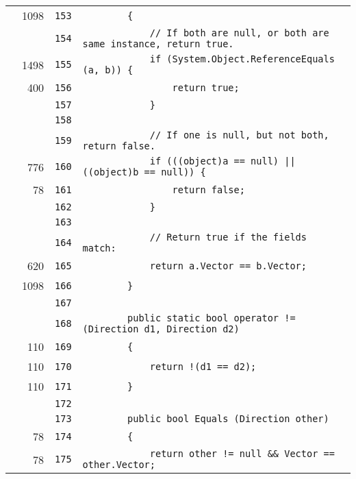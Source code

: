 \documentclass[a4paper,10pt]{article}
\begin{document}
\begin{longtable}[l]{lrrl}
\cellcolor{green} & 1098 & \verb~153~ & \verb~        {~\\
\cellcolor{gray} &  & \verb~154~ & \verb~            // If both are null, or both are same instance, return true.~\\
\cellcolor{green} & 1498 & \verb~155~ & \verb~            if (System.Object.ReferenceEquals (a, b)) {~\\
\cellcolor{green} & 400 & \verb~156~ & \verb~                return true;~\\
\cellcolor{gray} &  & \verb~157~ & \verb~            }~\\
\cellcolor{gray} &  & \verb~158~ & \verb~~\\
\cellcolor{gray} &  & \verb~159~ & \verb~            // If one is null, but not both, return false.~\\
\cellcolor{green} & 776 & \verb~160~ & \verb~            if (((object)a == null) || ((object)b == null)) {~\\
\cellcolor{green} & 78 & \verb~161~ & \verb~                return false;~\\
\cellcolor{gray} &  & \verb~162~ & \verb~            }~\\
\cellcolor{gray} &  & \verb~163~ & \verb~~\\
\cellcolor{gray} &  & \verb~164~ & \verb~            // Return true if the fields match:~\\
\cellcolor{green} & 620 & \verb~165~ & \verb~            return a.Vector == b.Vector;~\\
\cellcolor{green} & 1098 & \verb~166~ & \verb~        }~\\
\cellcolor{gray} &  & \verb~167~ & \verb~~\\
\cellcolor{gray} &  & \verb~168~ & \verb~        public static bool operator != (Direction d1, Direction d2)~\\
\cellcolor{green} & 110 & \verb~169~ & \verb~        {~\\
\cellcolor{green} & 110 & \verb~170~ & \verb~            return !(d1 == d2);~\\
\cellcolor{green} & 110 & \verb~171~ & \verb~        }~\\
\cellcolor{gray} &  & \verb~172~ & \verb~~\\
\cellcolor{gray} &  & \verb~173~ & \verb~        public bool Equals (Direction other)~\\
\cellcolor{green} & 78 & \verb~174~ & \verb~        {~\\
\cellcolor{green} & 78 & \verb~175~ & \verb~            return other != null && Vector == other.Vector;~\\

\end{longtable}
\end{document}
